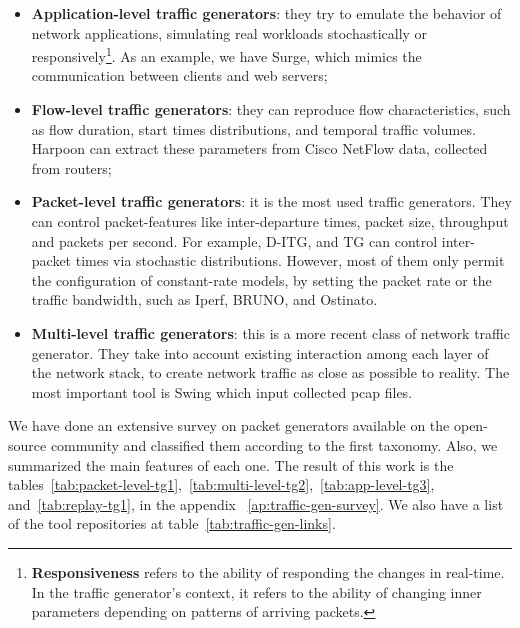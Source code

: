 \begin{itemize}

\item \textbf{Application-level traffic generators}: they try to emulate the behavior of network applications, simulating real workloads stochastically or responsively\footnote{\textbf{Responsiveness} refers to the ability of responding the changes in real-time. In the traffic generator's context, it refers to the ability of changing inner parameters depending on patterns of arriving packets.}. As an example, we have Surge, which mimics the communication between clients and web
servers;

\item \textbf{Flow-level traffic generators}: they can reproduce flow characteristics, such as flow duration, start times distributions, and temporal traffic volumes. Harpoon can extract these parameters from Cisco NetFlow data, collected from routers;

\item \textbf{Packet-level traffic generators}: it is the most used traffic generators. They can control packet-features like inter-departure times, packet size, throughput and packets per second. For example, D-ITG\cite{ditg-paper}, and TG\cite{web-tg} can control inter-packet times via stochastic distributions. However, most of them only permit the configuration of constant-rate models, by setting the packet rate or the traffic bandwidth, such as Iperf\cite{web-iperf}, BRUNO\cite{bruno-paper}, and Ostinato\cite{web-ostinato}.

\item \textbf{Multi-level traffic generators}: this is a more recent class of network traffic generator. They take into account existing interaction among each layer of the network stack, to create network traffic as close as possible to reality. The most important tool is Swing\cite{swing-paper} which input collected pcap files. 

\end{itemize}


We have done an extensive survey on packet generators available on the open-source community and classified them according to the first taxonomy. Also, we summarized the main features of each one. The result of this work is the tables~\ref{tab:packet-level-tg1},~\ref{tab:multi-level-tg2},~\ref{tab:app-level-tg3}, and~\ref{tab:replay-tg1}, in the appendix ~\ref{ap:traffic-gen-survey}. We also have a list of the tool repositories at table~\ref{tab:traffic-gen-links}.


